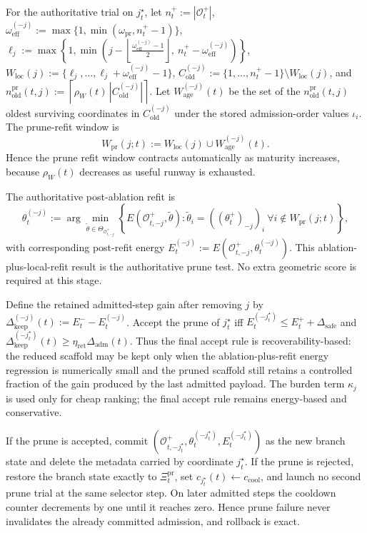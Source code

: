 \documentclass[11pt]{article}
\begin{document}
For the authoritative trial on \(j_t^\star\), let \(n_t^+:=|\mathcal O_t^+|\), \(\omega_{\mathrm{eff}}^{(-j)}:=\max\{1,\min(\omega_{\mathrm{pr}},n_t^+-1)\}\), \(\ell_j:=\max\!\left\{1,\min\!\left(j-\left\lfloor\frac{\omega_{\mathrm{eff}}^{(-j)}-1}{2}\right\rfloor,\ n_t^+-\omega_{\mathrm{eff}}^{(-j)}\right)\right\}\), \(W_{\mathrm{loc}}(j):=\{\ell_j,\dots,\ell_j+\omega_{\mathrm{eff}}^{(-j)}-1\}\), \(C_{\mathrm{old}}^{(-j)}:=\{1,\dots,n_t^+-1\}\setminus W_{\mathrm{loc}}(j)\), and \(n_{\mathrm{old}}^{\mathrm{pr}}(t,j):=\left\lceil \rho_W(t)\,|C_{\mathrm{old}}^{(-j)}| \right\rceil\). Let \(W_{\mathrm{age}}^{(-j)}(t)\) be the set of the \(n_{\mathrm{old}}^{\mathrm{pr}}(t,j)\) oldest surviving coordinates in \(C_{\mathrm{old}}^{(-j)}\) under the stored admission-order values \(\iota_i\). The prune-refit window is
\[
W_{\mathrm{pr}}(j;t)
:=
W_{\mathrm{loc}}(j)\cup W_{\mathrm{age}}^{(-j)}(t).
\]
Hence the prune refit window contracts automatically as maturity increases, because \(\rho_W(t)\) decreases as useful runway is exhausted.

The authoritative post-ablation refit is
\[
\theta_t^{(-j)}
:=
\arg\min_{\widetilde\theta\in\Theta_{\mathcal O_{t,-j}^+}}
\left\{
E(\mathcal O_{t,-j}^+,\widetilde\theta):
\widetilde\theta_i=((\theta_t^+)_{-j})_i
\ \forall i\notin W_{\mathrm{pr}}(j;t)
\right\},
\]
with corresponding post-refit energy \(E_t^{(-j)}:=E(\mathcal O_{t,-j}^+,\theta_t^{(-j)})\). This ablation-plus-local-refit result is the authoritative prune test. No extra geometric score is required at this stage.

Define the retained admitted-step gain after removing \(j\) by \(\Delta_{\mathrm{keep}}^{(-j)}(t):=E_t^- - E_t^{(-j)}\). Accept the prune of \(j_t^\star\) iff \(E_t^{(-j_t^\star)}\le E_t^+ + \Delta_{\mathrm{safe}}\) and \(\Delta_{\mathrm{keep}}^{(-j_t^\star)}(t)\ge \eta_{\mathrm{ret}}\Delta_{\mathrm{adm}}(t)\). Thus the final accept rule is recoverability-based: the reduced scaffold may be kept only when the ablation-plus-refit energy regression is numerically small and the pruned scaffold still retains a controlled fraction of the gain produced by the last admitted payload. The burden term \(\kappa_j\) is used only for cheap ranking; the final accept rule remains energy-based and conservative.

If the prune is accepted, commit \((\mathcal O_{t,-j_t^\star}^+,\theta_t^{(-j_t^\star)},E_t^{(-j_t^\star)})\) as the new branch state and delete the metadata carried by coordinate \(j_t^\star\). If the prune is rejected, restore the branch state exactly to \(\Xi_t^{\mathrm{pr}}\), set \(c_{j_t^\star}(t)\leftarrow c_{\mathrm{cool}}\), and launch no second prune trial at the same selector step. On later admitted steps the cooldown counter decrements by one until it reaches zero. Hence prune failure never invalidates the already committed admission, and rollback is exact.
\end{document}
